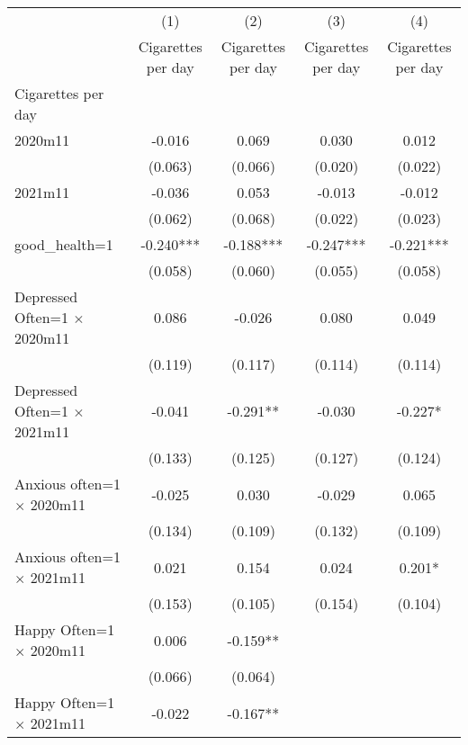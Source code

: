 \begin{table}[htbp]\centering
\def\sym#1{\ifmmode^{#1}\else\(^{#1}\)\fi}
\caption{}
\begin{tabular}{l*{4}{c}}
\toprule
                &\multicolumn{1}{c}{(1)}&\multicolumn{1}{c}{(2)}&\multicolumn{1}{c}{(3)}&\multicolumn{1}{c}{(4)}\\
                &\multicolumn{1}{c}{Cigarettes per day}&\multicolumn{1}{c}{Cigarettes per day}&\multicolumn{1}{c}{Cigarettes per day}&\multicolumn{1}{c}{Cigarettes per day}\\
\midrule
Cigarettes per day&            &            &            &            \\
2020m11         &   -0.016   &    0.069   &    0.030   &    0.012   \\
                &  (0.063)   &  (0.066)   &  (0.020)   &  (0.022)   \\
2021m11         &   -0.036   &    0.053   &   -0.013   &   -0.012   \\
                &  (0.062)   &  (0.068)   &  (0.022)   &  (0.023)   \\
good\_health=1   &   -0.240***&   -0.188***&   -0.247***&   -0.221***\\
                &  (0.058)   &  (0.060)   &  (0.055)   &  (0.058)   \\
Depressed Often=1 $\times$ 2020m11&    0.086   &   -0.026   &    0.080   &    0.049   \\
                &  (0.119)   &  (0.117)   &  (0.114)   &  (0.114)   \\
Depressed Often=1 $\times$ 2021m11&   -0.041   &   -0.291** &   -0.030   &   -0.227*  \\
                &  (0.133)   &  (0.125)   &  (0.127)   &  (0.124)   \\
Anxious often=1 $\times$ 2020m11&   -0.025   &    0.030   &   -0.029   &    0.065   \\
                &  (0.134)   &  (0.109)   &  (0.132)   &  (0.109)   \\
Anxious often=1 $\times$ 2021m11&    0.021   &    0.154   &    0.024   &    0.201*  \\
                &  (0.153)   &  (0.105)   &  (0.154)   &  (0.104)   \\
Happy Often=1 $\times$ 2020m11&    0.006   &   -0.159** &            &            \\
                &  (0.066)   &  (0.064)   &            &            \\
Happy Often=1 $\times$ 2021m11&   -0.022   &   -0.167** &            &            \\

\end{tabular}
\end{table}
